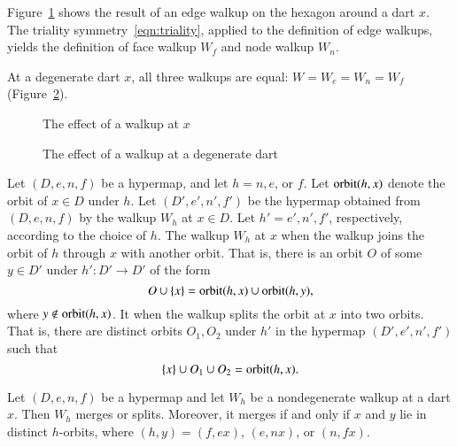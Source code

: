 Figure~\ref{fig:walk} shows
the result of an edge walkup on the hexagon around a dart $x$.
The triality symmetry~\ref{eqn:triality}, applied to the definition
of edge walkups, yields the definition of
face walkup $W_f$ and node walkup $W_n$.  

At a degenerate dart $x$, all three walkups are equal:
$W=W_e=W_n=W_f$ (Figure~\ref{fig:walkdegen}).
%
%

\begin{figure}[htb]
\centering
{}
\caption{The effect of a walkup at $x$}
\label{fig:walk}
\end{figure}


\begin{figure}[htb]
\centering
{}
\caption{The effect of a walkup at a degenerate dart}
\label{fig:walkdegen}
\end{figure}


\begin{definition} 
Let $(D,e,n,f)$ be a hypermap, and let $h=n,e$, or $f$.  Let ${\operatorname{orbit}}(h,x)$
denote the orbit of $x\in D$ under $h$.  Let $(D',e',n',f')$ be the hypermap obtained
from $(D,e,n,f)$ by the walkup $W_h$ at $x\in D$.
Let $h'=e',n',f'$, respectively, according to the choice of $h$.
The walkup $W_h$ at $x$  when the walkup joins the
orbit of $h$ through $x$ with another orbit.  That is, there is an orbit $O$ of some
$y\in D'$ under $h':D'\to D'$ of the form
\begin{displaymath}
O \cup\{x\} = {\operatorname{orbit}}(h,x) \cup {\operatorname{orbit}}(h,y),
\end{displaymath}
where $y\not\in {\operatorname{orbit}}(h,x)$.
It 
when the walkup splits the orbit at $x$ into two orbits.  That is, there are 
distinct orbits $O_1,O_2$ under $h'$ in the hypermap $(D',e',n',f')$ such that
\begin{displaymath}
\{x\}\cup O_1\cup O_2 = {\operatorname{orbit}}(h,x).
\end{displaymath}
%
%
%
\end{definition}

\begin{lemma} 
  Let $(D,e,n,f)$ be a hypermap and let $W_h$ be a nondegenerate
  walkup at a dart $x$.  Then $W_h$ merges or splits. Moreover, it merges if
  and only if $x$ and $y$ lie in distinct $h$-orbits, where
  $(h,y)=(f,e x)$,  $(e,n x)$, or $(n,f x)$.
\end{lemma}

